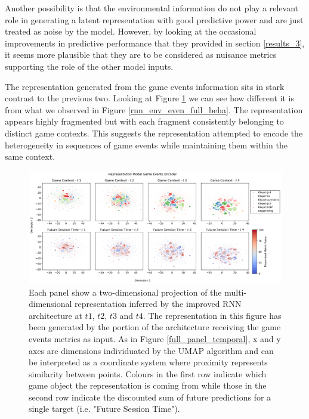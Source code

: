 Another possibility is that the environmental information do not play a relevant role in generating a latent representation with good predictive power and are just treated as noise by the model. However, by looking at the occasional improvements in predictive performance that they provided in section \ref{results_3}, it seems more plausible that they are to be considered as nuisance metrics supporting the role of the other model inputs. 

The representation generated from the game events information sits in stark contrast to the previous two. Looking at Figure \ref{rnn_env_even_full_events} we can see how different it is from what we observed in Figure \ref{rnn_env_even_full_beha}. The representation appears highly fragmented but with each fragment consistently belonging to distinct game contexts. This suggests the representation attempted to encode the heterogeneity in sequences of game events while maintaining them within the same context.

\begin{figure}[!htb]
\centering
\includegraphics[width=\textwidth]{images/chapter_4/RNN_env_even_0_lstm_layer_events_Future Session Time.png}
\caption[\textbf{Lower dimensional representation of the latent representations generated by the improved version of the RNN architecture from the game events metrics}]{Each panel show a two-dimensional projection of the multi-dimensional representation inferred by the improved RNN architecture at $t1$, $t2$, $t3$ and $t4$. The representation in this figure has been generated by the portion of the architecture receiving the game events metrics as input. As in Figure \ref{full_panel_temporal}, x and y axes are dimensions individuated by the UMAP algorithm and can be interpreted as a coordinate system where proximity represents similarity between points. Colours in the first row indicate which game object the representation is coming from while those in the second row indicate the discounted sum of future predictions for a single target (i.e. "Future Session Time").}
\label{rnn_env_even_full_events}
\end{figure}

